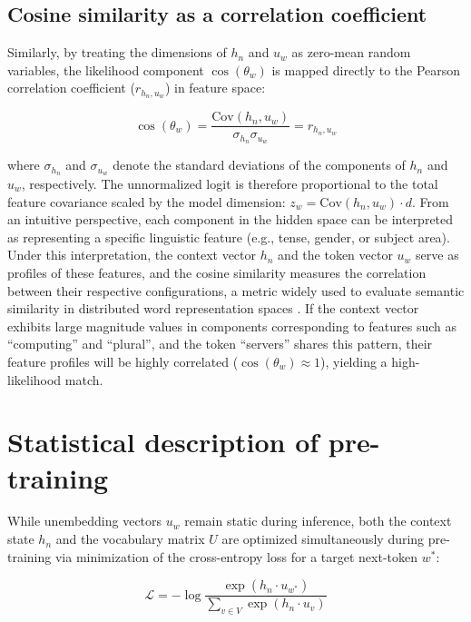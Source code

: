 \documentclass[11pt,a4paper]{article}
\begin{document}
	\subsection{Cosine similarity as a correlation coefficient}
	Similarly, by treating the dimensions of $h_n$ and $u_w$ as zero-mean random variables, the likelihood component $\cos(\theta_w)$ is mapped directly to the Pearson correlation coefficient ($r_{h_n, u_w}$) in feature space:
	
	\begin{equation}
		\cos(\theta_w) = \frac{\text{Cov}(h_n, u_w)}{\sigma_{h_n} \sigma_{u_w}} = r_{h_n, u_w}
	\end{equation}
	
	where $\sigma_{h_n}$ and $\sigma_{u_w}$ denote the standard deviations of the components of $h_n$ and $u_w$, respectively. The unnormalized logit is therefore proportional to the total feature covariance scaled by the model dimension: $z_w = \text{Cov}(h_n, u_w) \cdot d$. From an intuitive perspective, each component in the hidden space can be interpreted as representing a specific linguistic feature (e.g., tense, gender, or subject area). Under this interpretation, the context vector $h_n$ and the token vector $u_w$ serve as profiles of these features, and the cosine similarity measures the correlation between their respective configurations, a metric widely used to evaluate semantic similarity in distributed word representation spaces \citep{mikolov2013distributed}. If the context vector exhibits large magnitude values in components corresponding to features such as ``computing'' and ``plural'', and the token ``servers'' shares this pattern, their feature profiles will be highly correlated ($\cos(\theta_w) \approx 1$), yielding a high-likelihood match.
	
	\section{Statistical description of pre-training}
	
	While unembedding vectors $u_w$ remain static during inference, both the context state $h_n$ and the vocabulary matrix $U$ are optimized simultaneously during pre-training via minimization of the cross-entropy loss \citep{shannon1948mathematical} for a target next-token $w^*$:
	
	\begin{equation}
		\mathcal{L} = -\log \frac{\exp(h_n \cdot u_{w^*})}{\sum_{v \in V} \exp(h_n \cdot u_v)}
	\end{equation}
	
\end{document}
